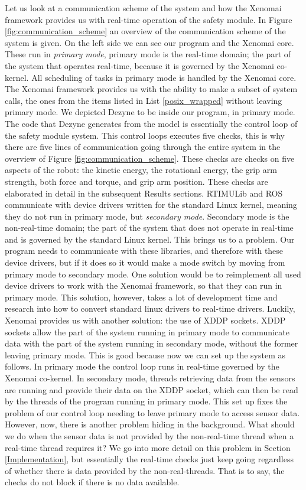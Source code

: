 \documentclass[12pt]{scrreprt}
\begin{document}
Let us look at a communication scheme of the system and how the Xenomai framework provides us with real-time operation of the safety module. In Figure \ref{fig:communication_scheme} an overview of the communication scheme of the system is given. On the left side we can see our program and the Xenomai core. These run in \textit{primary mode}, primary mode is the real-time domain; the part of the system that operates real-time, because it is governed by the Xenomai co-kernel. All scheduling of tasks in primary mode is handled by the Xenomai core. The Xenomai framework provides us with the ability to make a subset of system calls, the ones from the items listed in List \ref{posix_wrapped} without leaving primary mode. We depicted Dezyne to be inside our program, in primary mode. The code that Dezyne generates from the model is essentially the control loop of the safety module system. This control loops executes five checks, this is why there are five lines of communication going through the entire system in the overview of Figure \ref{fig:communication_scheme}. These checks are checks on five aspects of the robot: the kinetic energy, the rotational energy, the grip arm strength, both force and torque, and grip arm position. These checks are elaborated in detail in the subsequent Results sections. RTIMULib and ROS communicate with device drivers written for the standard Linux kernel, meaning they do not run in primary mode, but \textit{secondary mode}. Secondary mode is the non-real-time domain; the part of the system that does not operate in real-time and is governed by the standard Linux kernel. This brings us to a problem. Our program needs to communicate with these libraries, and therefore with these device drivers, but if it does so it would make a mode switch by moving from primary mode to secondary mode. One solution would be to reimplement all used device drivers to work with the Xenomai framework, so that they can run in primary mode. This solution, however, takes a lot of development time and research into how to convert standard linux drivers to real-time drivers. Luckily, Xenomai provides us with another solution: the use of XDDP sockets. XDDP sockets allow the part of the system running in primary mode to communicate data with the part of the system running in secondary mode, without the former leaving primary mode. This is good because now we can set up the system as follows. In primary mode the control loop runs in real-time governed by the Xenomai co-kernel. In secondary mode, threads retrieving data from the sensors are running and provide their data on the XDDP socket, which can then be read by the threads of the program running in primary mode. This set up fixes the problem of our control loop needing to leave primary mode to access sensor data. However, now, there is another problem hiding in the background. What should we do when the sensor data is not provided by the non-real-time thread when a real-time thread requires it? We go into more detail on this problem in Section \ref{Implementation}, but essentially the real-time checks just keep going regardless of whether there is data provided by the non-real-threads. That is to say, the checks do not block if there is no data available.
\end{document}
